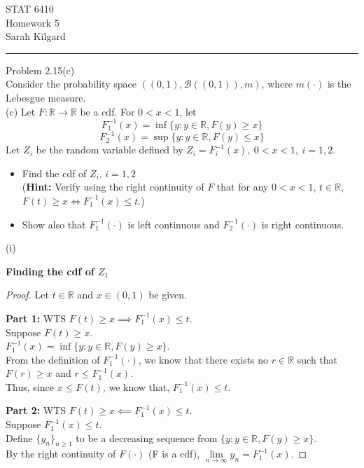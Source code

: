\documentclass[12pt,letterpaper, onecolumn]{exam}
\newcommand{\real}{\mathbb{R}}
\newcommand{\cutelim}{\lim\limits_{n\to\infty}}
\newcommand{\calB}{\mathcal{B}}
\begin{document}
\begingroup  
    \centering
    \LARGE STAT 6410\\
    \LARGE Homework 5\\[0.5em]
    \large Sarah Kilgard\par
\endgroup
\rule{\textwidth}{0.4pt}
\pointsdroppedatright   %
\printanswers
\renewcommand{\solutiontitle}{\noindent\textbf{Ans:}\enspace}   %

\begin{questions}
    \question Problem 2.15(c) \\
    Consider the probability space $((0, 1), \calB((0, 1)), m)$, where $m(\cdot)$ is the Lebesgue measure. \\
    (c) Let $F:\real \to \real$ be a cdf. For $0 < x < 1$, let 
    \[F_1^{-1}(x) = \inf\{y: y \in \real, F(y) \geq x\}\]
    \[F_2^{-1}(x) = \sup\{y: y \in \real, F(y) \leq x\}\]
    Let $Z_i$ be the random variable defined by $Z_i = F_i^{-1}(x), \: 0 < x < 1, \: i = 1, 2.$
    \begin{itemize}
        \item[(i)] Find the cdf of $Z_i$, $i = 1, 2$ \\
        (\textbf{Hint:} Verify using the right continuity of $F$ that for any $0 < x < 1$, $t \in \real$, $F(t) \geq x \iff F_1^{-1}(x) \leq t.$)
        \item[(ii)] Show also that $F_1^{-1}(\cdot)$ is left continuous and $F_2^{-1}(\cdot)$ is right continuous.  
    \end{itemize}
    \begin{solution}
    (i) 
    
    \textbf{Finding the cdf of $Z_1$} 
    \begin{proof}
        Let $t \in \real$ and $x \in (0, 1)$ be given. 
        
        \textbf{Part 1:} WTS $F(t) \geq x \implies F_1^{-1}(x) \leq t.$ \\
        Suppose $F(t) \geq x$. \\
        $F_1^{-1}(x) = \inf\{y: y \in \real, F(y) \geq x\} $. \\
        From the definition of $F_1^{-1}(\cdot)$, we know that there exists no $r \in \real$ such that $F(r) \geq x$ and $r \leq F_1^{-1}(x)$. \\
        Thus, since $x \leq F(t)$, we know that, $F_1^{-1}(x) \leq t$. 

        \textbf{Part 2:} WTS $F(t) \geq x \impliedby F_1^{-1}(x) \leq t.$ \\
        Suppose $F_1^{-1}(x) \leq t$. \\
        Define $\{y_n\}_{n \geq 1}$ to be a decreasing sequence from $\{y: y \in \real, F(y) \geq x\}$. \\
        By the right continuity of $F(\cdot)$ (F is a cdf), $\cutelim y_n = F_1^{-1}(x)$. 


\end{proof}
\end{solution}
\end{questions}
\end{document}

